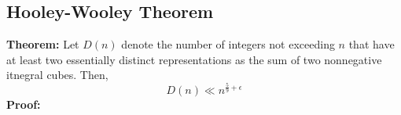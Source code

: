 \documentclass[8pt]{extarticle}
\begin{document}
\subsection{Hooley-Wooley Theorem}
\begin{boxedsection}
    \textbf{Theorem:} Let $D(n)$ denote the number of integers not exceeding $n$ that have at least two essentially distinct representations as the sum of two nonnegative itnegral cubes. Then,
    $$
    D(n) \ll n^{\frac{5}{9} + \epsilon}
    $$
    \textbf{Proof:} 
\end{boxedsection}
\end{document}
